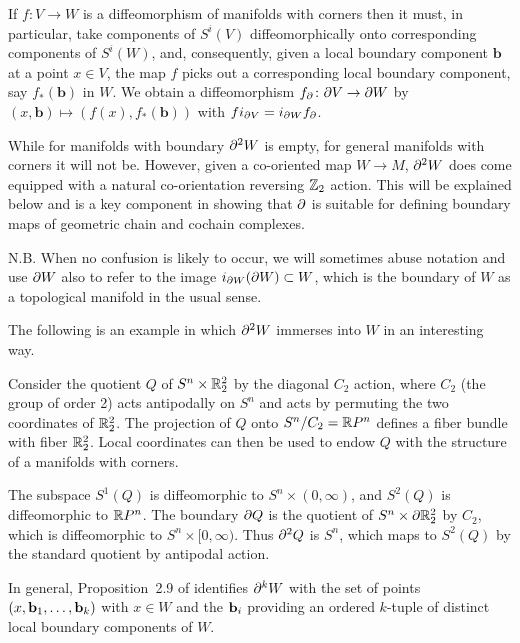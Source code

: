 \begin{remark}\label{R: bd diff}
	If $f \colon V \to W$ is a diffeomorphism of manifolds with corners then it must, in particular, take components of $S^i(V)$ diffeomorphically onto corresponding components of $S^i(W)$, and, consequently, given a local boundary component $\mathbf{b}$ at a point $x \in V$, the map $f$ picks out a corresponding local boundary component, say $f_*(\mathbf{b})$ in $W$. We obtain a diffeomorphism $f_\partial \colon \partial V \to \partial W$ by $(x,\mathbf{b})\mapsto (f(x),f_*(\mathbf{b}))$ with $fi_{\partial V} = i_{\partial W} f_\partial$.
\end{remark}

While for manifolds with boundary $\partial^2 W$ is empty, for general manifolds with corners it will not be.
However, given a co-oriented map $W \to M$, $\partial^2 W$ does come equipped with a natural co-orientation reversing $\mathbb{Z}_2$ action.
This will be explained below and is a key component in showing that $\partial$ is suitable for defining boundary maps of geometric chain and cochain complexes.

N.B. When no confusion is likely to occur, we will sometimes abuse notation and use $\partial W$ also to refer to the image $i_{\partial W}(\partial W) \subset W$, which is the boundary of $W$ as a topological manifold in the usual sense.

The following is an example in which $\partial^2 W$ immerses into $W$ in an interesting way.

\begin{example}\label{boundary}
	Consider the quotient $Q$ of $S^n \times \mathbb{R}^2_2$ by the diagonal $C_2$ action, where $C_2$ (the group of order 2) acts antipodally on $S^n$ and acts by permuting the two coordinates
	of $\mathbb{R}^2_2$.
	The projection of $Q$ onto $S^n / C_2 = \mathbb{R} P^n$ defines a fiber bundle with fiber $\mathbb{R}^2_2$.
	Local coordinates can then be used to endow $Q$ with the structure of a manifolds with corners.

	The subspace $S^1(Q)$ is diffeomorphic to $S^n \times (0,\infty)$, and $S^2(Q)$ is diffeomorphic to $\mathbb{R} P^n$.
	The boundary $\partial Q$ is the quotient of $S^n \times \partial \mathbb{R}^2_2$ by $C_2$, which is diffeomorphic to
	$S^n \times [0,\infty)$.
	Thus $\partial^2 Q$ is $S^n$, which maps to $S^2(Q)$ by the standard quotient by antipodal action.
\end{example}

In general, Proposition~2.9 of \cite{Joy12} identifies $\partial^k W$ with the set of points $(x,\mathbf{b}_1,\ldots,\mathbf{b}_k)$ with $x \in W$ and the $\mathbf{b}_i$ providing an ordered $k$-tuple of distinct local boundary components of $W$.


